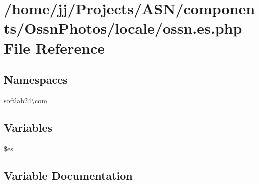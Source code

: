 \hypertarget{components_2_ossn_photos_2locale_2ossn_8es_8php}{}\section{/home/jj/\+Projects/\+A\+S\+N/components/\+Ossn\+Photos/locale/ossn.es.\+php File Reference}
\label{components_2_ossn_photos_2locale_2ossn_8es_8php}
\subsection*{Namespaces}
\begin{DoxyCompactItemize}
\item 
 \hyperlink{namespacesoftlab24_1_1com}{softlab24\textbackslash{}com}
\end{DoxyCompactItemize}
\subsection*{Variables}
\begin{DoxyCompactItemize}
\item 
\hyperlink{components_2_ossn_photos_2locale_2ossn_8es_8php_a388cbda27103d2baee3997798d1f2744}{\$es}
\end{DoxyCompactItemize}


\subsection{Variable Documentation}
